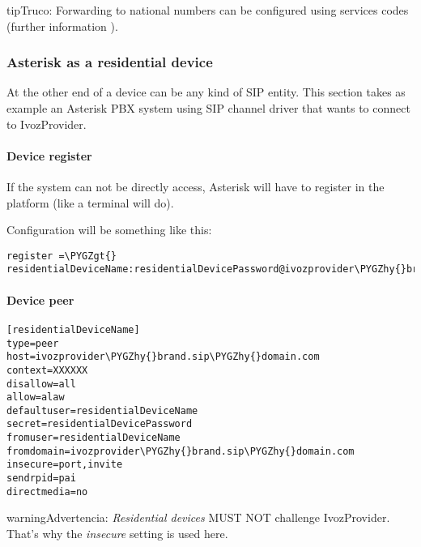 \documentclass[letterpaper,10pt,spanish]{sphinxmanual}
\def\PYGZgt{\char`\>}
\def\PYGZhy{\char`\-}
\begin{document}
\begin{notice}{tip}{Truco:}
Forwarding to national numbers can be configured using services codes
(further information {\hyperref[administration_portal/brand/settings/generic_services:call\string-forward\string-services]{}}).
\end{notice}


\subsubsection{Asterisk as a residential device}
\label{administration_portal/client/residential/residential_devices:asterisk-as-a-residential-device}
At the other end of a device can be any kind of SIP entity. This section takes
as example an Asterisk PBX system using SIP channel driver that wants to connect
to IvozProvider.


\paragraph{Device register}
\label{administration_portal/client/residential/residential_devices:device-register}
If the system can not be directly access, Asterisk will have to register in the
platform (like a terminal will do).

Configuration will be something like this:

\begin{Verbatim}[commandchars=\\\{\}]
register =\PYGZgt{} residentialDeviceName:residentialDevicePassword@ivozprovider\PYGZhy{}brand.sip\PYGZhy{}domain.com
\end{Verbatim}


\paragraph{Device peer}
\label{administration_portal/client/residential/residential_devices:device-peer}
\begin{Verbatim}[commandchars=\\\{\}]
[residentialDeviceName]
type=peer
host=ivozprovider\PYGZhy{}brand.sip\PYGZhy{}domain.com
context=XXXXXX
disallow=all
allow=alaw
defaultuser=residentialDeviceName
secret=residentialDevicePassword
fromuser=residentialDeviceName
fromdomain=ivozprovider\PYGZhy{}brand.sip\PYGZhy{}domain.com
insecure=port,invite
sendrpid=pai
directmedia=no
\end{Verbatim}

\begin{notice}{warning}{Advertencia:}
\emph{Residential devices} MUST NOT challenge IvozProvider. That's
why the \emph{insecure} setting is used here.
\end{notice}
\end{document}
